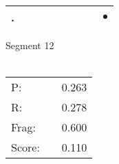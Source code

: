 \documentclass[landscape]{article}
\newcommand{\ssp}{\hspace{2pt}}
\newcommand{\mex}{\cellcolor{g}$\bullet$}
\begin{document}
\begin{tabular}{|l|p{10pt}|p{10pt}|p{10pt}|p{10pt}|p{10pt}|p{10pt}|p{10pt}|p{10pt}|}
\hline
\ssp \cellcolor{ref7}. \ssp&\hspace{2pt}&\hspace{2pt}&\hspace{2pt}&\hspace{2pt}&\hspace{2pt}&\hspace{2pt}&\hspace{2pt}&\hspace{2pt}\mex\\
\hline
\end{tabular}

\vspace{6pt}
\noindent Segment 12\\\\
\noindent\begin{tabular}{lm{12pt}r}
\hline
P:&&0.263\\
R:&&0.278\\
Frag:&&0.600\\
Score:&&0.110\\
\end{tabular}

\newpage
\end{document}
